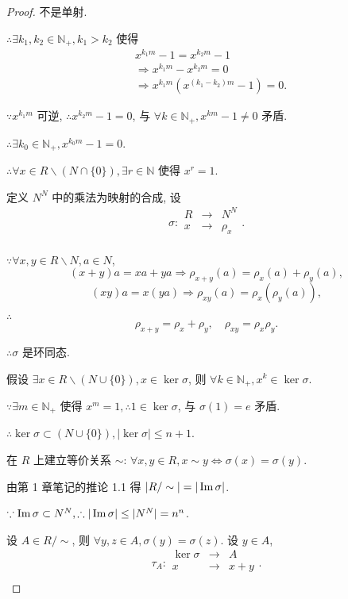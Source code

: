 \documentclass[color=black,device=normal,lang=cn,mode=geye]{elegantnote}
\begin{document}
\begin{proof}
    不是单射.

    $\therefore\exists k_1,k_2\in\mathbb{N}_+,k_1>k_2$ 使得
    \begin{align*}
        & x^{k_1m}-1=x^{k_2m}-1 \\
        & \Rightarrow x^{k_1m}-x^{k_2m}=0 \\
        & \Rightarrow x^{k_1m}(x^{(k_1-k_2)m}-1)=0.
    \end{align*}

    $\because x^{k_1m}$ 可逆, $\therefore x^{k_2m}-1=0$, 与 $\forall k\in\mathbb{N}_+,x^{km}-1\neq0$ 矛盾.

    $\therefore\exists k_0\in\mathbb{N}_+,x^{k_0m}-1=0$.

    $\therefore\forall x\in R\backslash(N\cap\{0\}),\exists r\in\mathbb{N}$ 使得 $x^r=1$.

    定义 $N^N$ 中的乘法为映射的合成, 设
    \[\sigma:\begin{array}{rcl}
        R & \to & N^N \\
        x & \to & \rho_x \\
    \end{array}.\]

    $\because\forall x,y\in R\backslash N,a\in N$,
    \[(x+y)a=xa+ya\Rightarrow\rho_{x+y}(a)=\rho_x(a)+\rho_y(a),\]
    \[(xy)a=x(ya)\Rightarrow\rho_{xy}(a)=\rho_x(\rho_y(a)),\]

    $\therefore$
    \[\rho_{x+y}=\rho_x+\rho_y,\quad\rho_{xy}=\rho_x\rho_y.\]

    $\therefore\sigma$ 是环同态.

    假设 $\exists x\in R\backslash(N\cup\{0\}),x\in\ker\sigma$, 则 $\forall k\in\mathbb{N}_+,x^k\in\ker\sigma$.

    $\because\exists m\in\mathbb{N}_+$ 使得 $x^m=1,\therefore1\in\ker\sigma$, 与 $\sigma(1)=e$ 矛盾.

    $\therefore\ker\sigma\subset(N\cup\{0\}),|\ker\sigma|\leq n+1$.

    在 $R$ 上建立等价关系 $\sim$: $\forall x,y\in R,x\sim y\Leftrightarrow\sigma(x)=\sigma(y)$.

    由第 1 章笔记的推论 1.1 得 $|R/\sim|=|\operatorname{Im}\sigma|$.

    $\because\operatorname{Im}\sigma\subset N^N,\therefore|\operatorname{Im}\sigma|\leq|N^N|=n^n$.

    设 $A\in R/\sim$, 则 $\forall y,z\in A,\sigma(y)=\sigma(z)$. 设 $y\in A$, 
    \[\tau_A:\begin{array}{rcl}
        \ker\sigma & \to & A \\
        x & \to & x+y \\
    \end{array}.\]


\end{proof}
\end{document}
